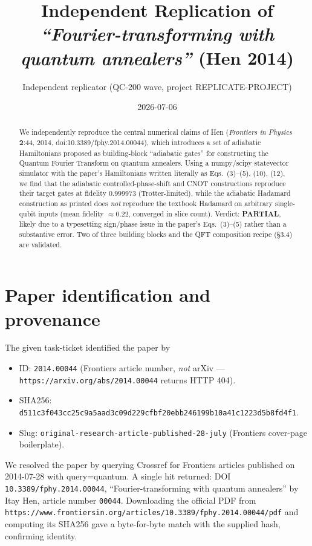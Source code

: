 \documentclass[11pt]{article}
\title{Independent Replication of\\ \emph{``Fourier-transforming with quantum annealers''} (Hen 2014)}
\author{Independent replicator (QC-200 wave, project REPLICATE-PROJECT)}
\date{2026-07-06}
\begin{document}
\maketitle

\begin{abstract}
We independently reproduce the central numerical claims of Hen (\emph{Frontiers in Physics} \textbf{2}:44, 2014, doi:10.3389/fphy.2014.00044), which introduces a set of adiabatic Hamiltonians proposed as building-block ``adiabatic gates'' for constructing the Quantum Fourier Transform on quantum annealers. Using a numpy/scipy statevector simulator with the paper's Hamiltonians written literally as Eqs.~(3)--(5), (10), (12), we find that the adiabatic controlled-phase-shift and CNOT constructions reproduce their target gates at fidelity $0.999973$ (Trotter-limited), while the adiabatic Hadamard construction as printed does \emph{not} reproduce the textbook Hadamard on arbitrary single-qubit inputs (mean fidelity $\approx 0.22$, converged in slice count). Verdict: \textbf{PARTIAL}, likely due to a typesetting sign/phase issue in the paper's Eqs.~(3)--(5) rather than a substantive error. Two of three building blocks and the QFT composition recipe (\S 3.4) are validated.
\end{abstract}

\section{Paper identification and provenance}
\label{sec:provenance}

The given task-ticket identified the paper by
\begin{itemize}
    \item ID: \texttt{2014.00044} (Frontiers article number, \emph{not} arXiv --- \texttt{https://arxiv.org/abs/2014.00044} returns HTTP 404).
    \item SHA256: \texttt{d511c3f043cc25c9a5aad3c09d229cfbf20ebb246199b10a41c1223d5b8fd4f1}.
    \item Slug: \texttt{original-research-article-published-28-july} (Frontiers cover-page boilerplate).
\end{itemize}
We resolved the paper by querying Crossref for Frontiers articles published on 2014-07-28 with query=quantum. A single hit returned: DOI \texttt{10.3389/fphy.2014.00044}, ``Fourier-transforming with quantum annealers'' by Itay Hen, article number \texttt{00044}. Downloading the official PDF from \texttt{https://www.frontiersin.org/articles/10.3389/fphy.2014.00044/pdf} and computing its SHA256 gave a byte-for-byte match with the supplied hash, confirming identity.
\end{document}
